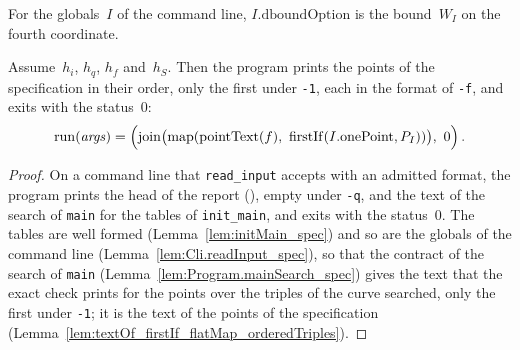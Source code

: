 \begin{definition}\label{def:Cli.Input.dboundOption}
  \leanok
  For the globals~$I$ of the command line, $I.\mathrm{dboundOption}$ is the bound~$W_I$ on the
  fourth coordinate.
\end{definition}

\begin{theorem}\label{thm:Program.run_eq_of_readInput_eq_ok_of_quiet}
  \leanok
  Assume~$h_i$, $h_q$, $h_f$ and~$h_S$. Then the program prints the points of the
  specification in their order, only the first under \texttt{-1}, each in the format of
  \texttt{-f}, and exits with the status~$0$:
  \[ \mathrm{run}(\mathit{args}) = \Bigl(\mathrm{join}\bigl(\mathrm{map}(\mathrm{pointText}(f),\
     \mathrm{firstIf}(I.\mathrm{onePoint}, P_I))\bigr),\ 0\Bigr)\,. \]
\end{theorem}

\begin{proof}
  \leanok
  On a command line that \texttt{read\_input} accepts with an admitted format, the program prints
  the head of the report (\lname{JPoints.Program.mainHead}), empty under \texttt{-q}, and the text
  of the search of \texttt{main} for the tables of \texttt{init\_main}, and exits with the
  status~$0$. The tables are well formed (Lemma~\ref{lem:initMain_spec}) and so are the globals of
  the command line (Lemma~\ref{lem:Cli.readInput_spec}), so that the contract of the search of
  \texttt{main} (Lemma~\ref{lem:Program.mainSearch_spec}) gives the text that the exact check prints
  for the points over the triples of the curve searched, only the first under \texttt{-1}; it is the
  text of the points of the specification
  (Lemma~\ref{lem:textOf_firstIf_flatMap_orderedTriples}).
\end{proof}

